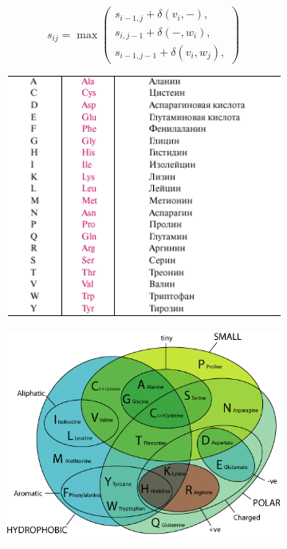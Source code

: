 \documentclass[letterpaper, 11pt]{article}
\begin{document}
$$s_{ij}=
\max
\begin{pmatrix}
	s_{i-1,j}+\delta(v_i,-), \\
	s_{i,j-1}+\delta(-,w_i), \\
	s_{i-1,j-1}+\delta(v_i,w_j),
\end{pmatrix}$$

\begin{figure}
\centering
\begin{subfigure}{.6\textwidth}
  \centering
  \includegraphics[width=\linewidth]{images/iupac_codes.png}
  \caption{}
  \label{fig:sub1}
\end{subfigure}%
\begin{subfigure}{.6\textwidth}
  \centering
  \includegraphics[width=\linewidth]{images/aa_properties.png}

\end{subfigure}
\end{figure}
\end{document}
